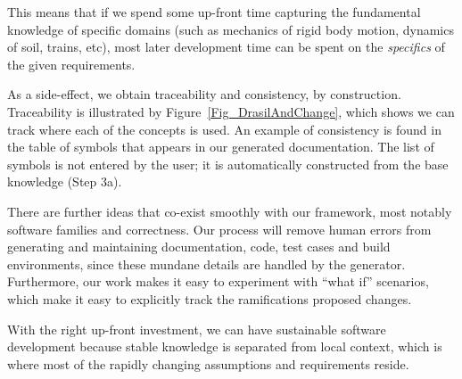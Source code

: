\documentclass[sigconf,review,anonymous=false]{acmart}
\begin{document}
This means that if we spend some up-front time capturing the fundamental
knowledge of specific domains (such as mechanics of rigid body motion,
dynamics of soil, trains, etc), most later development time can be
spent on the \emph{specifics} of the given requirements.

As a side-effect, we obtain traceability and consistency, by construction.
Traceability is illustrated by Figure~\ref{Fig_DrasilAndChange}, which shows we
can track where each of the concepts is used.  An example of consistency is
found in the table of symbols that appears in our generated documentation.  The
list of symbols is not entered by the user; it is automatically constructed from
the base knowledge (Step 3a).

There are further ideas that co-exist smoothly with our framework, most notably
software families and correctness.  Our process will remove human errors from
generating and maintaining documentation, code, test cases and build
environments, since these mundane details are handled by the generator.
Furthermore, our work makes it easy to experiment with ``what if'' scenarios,
which make it easy to explicitly track the
ramifications proposed changes.  

With the right up-front investment, we can have sustainable software
development because stable knowledge is separated from 
local context, which is where most of the rapidly changing assumptions
and requirements reside.

\newpage


\end{document}
